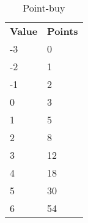 \begin{table}[h!]
    \begin{tabular}{l l}
        \bfseries{Value} & \bfseries{Points} \\
        -3 & 0 \\
        -2 & 1 \\
        -1 & 2 \\
        0 & 3 \\
        1 & 5 \\
        2 & 8 \\
        3 & 12 \\
        4 & 18 \\
        5 & 30 \\
        6 & 54 \\
    \end{tabular}
    \caption{Point-buy}
    \label{tab:point-buy}
\end{table}
